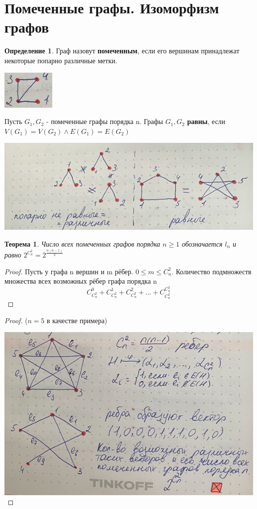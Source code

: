 \documentclass[a4paper, 12pt]{article}
\newtheorem*{theorem*}{Теорема}
\theoremstyle{definition}
\newtheorem*{definition*}{Определение}
\theoremstyle{definition}
\renewcommand{\leq}{\leqslant}
\renewcommand{\geq}{\geqslant}
\begin{document}
  \section{Помеченные графы. Изоморфизм графов}
  \begin{definition*}
    Граф назовут \textbf{помеченным}, если его вершинам принадлежат некоторые попарно различные метки.

    \includegraphics{metka.png}
  \end{definition*}

  Пусть $G_1, G_2$ - помеченные графы порядка n. Графы $G_1, G_2$ \textbf{равны}, если 
  $V(G_1)=V(G_2)\land E(G_1)=E(G_2)$

  \includegraphics{eq.png}

  \begin{theorem*}
    Число всех помеченных графов порядка $n\geq1$ обозначается $l_n$ и равно $2^{C^2_n}=2^{\frac{n(n-1)}{2}}$
  \end{theorem*}
  \begin{proof}
    Пусть у графа n вершин и m рёбер. $0\leq m\leq C^2_n$. Количество подмножеств множества всех возможных рёбер графа порядка n
    $$C^0_{C^2_n}+C^1_{C^2_n}+C^2_{C^2_n}+\dots+C^{C^2_n}_{C^2_n}$$
  \end{proof}
  \begin{proof}
    ($n=5$ в качестве примера)

    \includegraphics{proof.png}
  \end{proof}
\end{document}
